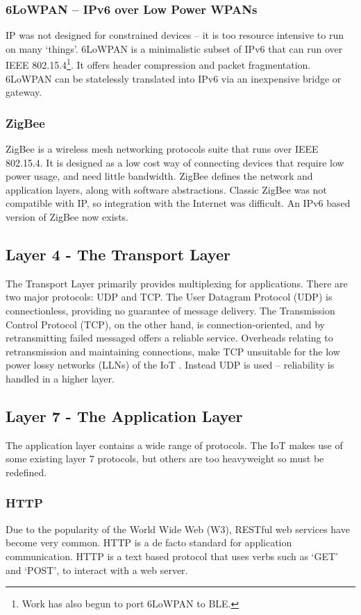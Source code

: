\documentclass[10pt,journal,compsoc]{IEEEtran}
\begin{document}
\subsubsection{6LoWPAN -- IPv6 over Low Power WPANs}
IP was not designed for constrained devices -- it is too resource intensive to
run on many `things'. 6LoWPAN is a minimalistic subset of IPv6 that can run
over IEEE 802.15.4\footnote{Work has also begun to port 6LoWPAN to BLE.}. It
offers header compression and packet fragmentation.  6LoWPAN can be statelessly
translated into IPv6 via an inexpensive bridge or gateway. 

\subsubsection{ZigBee}
ZigBee is a wireless mesh networking protocols suite that runs over IEEE
802.15.4. It is designed as a low cost way of connecting devices that require
low power usage, and need little bandwidth. ZigBee defines the network and
application layers, along with software abstractions. Classic ZigBee was not
compatible with IP, so integration with the Internet was difficult. An IPv6
based version of ZigBee now exists.

\subsection{Layer 4 - The Transport Layer}
The Transport Layer primarily provides multiplexing for applications. There are
two major protocols:  UDP and TCP. The User Datagram Protocol (UDP) is
connectionless, providing no guarantee of message delivery. The Transmission
Control Protocol (TCP), on the other hand, is connection-oriented, and by
retransmitting failed messaged offers a reliable service. Overheads relating to
retransmission and maintaining connections, make TCP unsuitable for the low power
lossy networks (LLNs) of the IoT \cite{embedded}. Instead UDP is used --
reliability is handled in a higher layer.

\subsection{Layer 7 - The Application Layer}
The application layer contains a wide range of protocols. The IoT  makes use of
some existing layer 7 protocols, but others are too heavyweight so must be
redefined. 

\subsubsection{HTTP} Due to the popularity of the World Wide Web (W3), RESTful
web services have become very common. HTTP is a de facto standard for
application communication. HTTP is a text based protocol that uses verbs such
as `GET' and `POST', to interact with a web server.  
\end{document}
